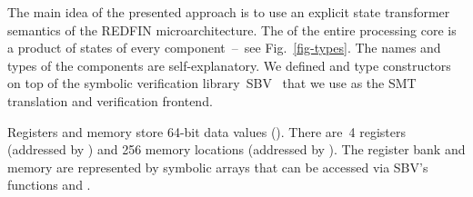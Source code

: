 The main idea of the presented approach is to use an explicit state transformer
semantics of the REDFIN microarchitecture. The  of the entire
processing core is a product of states of every component~--~see
Fig.~\ref{fig-types}. The names and types of the components are
self-explanatory. We defined  and  type
constructors on top of the symbolic verification library~SBV~\cite{SBV} that
we use as the SMT translation and verification frontend.






Registers and memory store 64-bit data values (). There are~4
registers (addressed by ) and 256 memory locations (addressed by
). The register bank and memory are represented by symbolic arrays
that can be accessed via SBV's functions  and .

